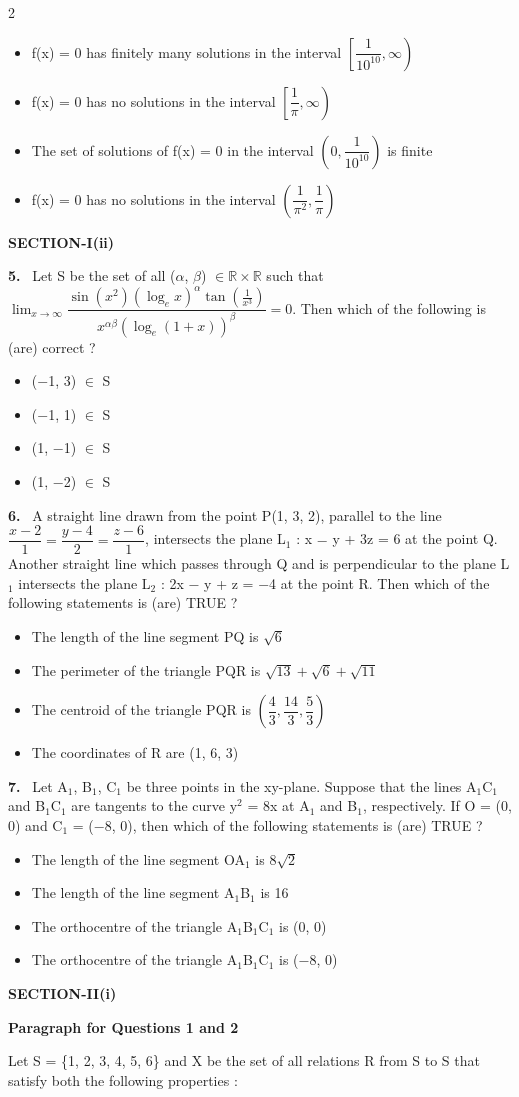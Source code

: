 \documentclass[10pt]{extarticle}
\newcommand{\sect}[1]{\par\smallskip\noindent\textbf{#1}\par}
\newcommand{\qn}[1]{\par\smallskip\noindent\textbf{#1.}~}
\newcommand{\paraq}[2]{\par\smallskip\noindent\textbf{Paragraph for Questions #1 and #2}\par}
\newenvironment{qoptions}{\begin{itemize}[leftmargin=1.8em,itemsep=1pt,topsep=2pt,label={}]}{\end{itemize}}
\newcommand{\opt}[2]{\item[(#1)] #2}
\begin{document}
\begin{multicols}{2}
\begin{qoptions}
\opt{A}{f(x) = 0 has finitely many solutions in the interval $\left[\dfrac1{10^{10}},\infty\right)$}
\opt{B}{f(x) = 0 has no solutions in the interval $\left[\dfrac1\pi,\infty\right)$}
\opt{C}{The set of solutions of f(x) = 0 in the interval $\left(0,\dfrac1{10^{10}}\right)$ is finite}
\opt{D}{f(x) = 0 has no solutions in the interval $\left(\dfrac1{\pi^2},\dfrac1\pi\right)$}
\end{qoptions}
\sect{SECTION-I(ii)}
\qn{5} Let S be the set of all ($\alpha$, $\beta$) $\in\mathbb R\times\mathbb R$ such that $\displaystyle\lim_{x\to\infty}\dfrac{\sin\left(x^2\right)\left(\log_ex\right)^\alpha\tan\left(\frac1{x^3}\right)}{x^{\alpha\beta}\left(\log_e(1+x)\right)^\beta}=0$. Then which of the following is (are) correct ?
\begin{qoptions}
\opt{A}{($-$1, 3) $\in$ S}
\opt{B}{($-$1, 1) $\in$ S}
\opt{C}{(1, $-$1) $\in$ S}
\opt{D}{(1, $-$2) $\in$ S}
\end{qoptions}
\qn{6} A straight line drawn from the point P(1, 3, 2), parallel to the line $\dfrac{x-2}1=\dfrac{y-4}2=\dfrac{z-6}1$, intersects the plane L$_1$ : x $-$ y + 3z = 6 at the point Q. Another straight line which passes through Q and is perpendicular to the plane L$_1$ intersects the plane L$_2$ : 2x $-$ y + z = $-$4 at the point R. Then which of the following statements is (are) TRUE ?
\begin{qoptions}
\opt{A}{The length of the line segment PQ is $\sqrt6$}
\opt{B}{The perimeter of the triangle PQR is $\sqrt{13}+\sqrt6+\sqrt{11}$}
\opt{C}{The centroid of the triangle PQR is $\left(\dfrac43,\dfrac{14}3,\dfrac53\right)$}
\opt{D}{The coordinates of R are (1, 6, 3)}
\end{qoptions}
\qn{7} Let A$_1$, B$_1$, C$_1$ be three points in the xy-plane. Suppose that the lines A$_1$C$_1$ and B$_1$C$_1$ are tangents to the curve y$^2$ = 8x at A$_1$ and B$_1$, respectively. If O = (0, 0) and C$_1$ = ($-$8, 0), then which of the following statements is (are) TRUE ?
\begin{qoptions}
\opt{A}{The length of the line segment OA$_1$ is 8$\sqrt2$}
\opt{B}{The length of the line segment A$_1$B$_1$ is 16}
\opt{C}{The orthocentre of the triangle A$_1$B$_1$C$_1$ is (0, 0)}
\opt{D}{The orthocentre of the triangle A$_1$B$_1$C$_1$ is ($-$8, 0)}
\end{qoptions}
\sect{SECTION-II(i)}
\paraq{1}{2}
Let S = \{1, 2, 3, 4, 5, 6\} and X be the set of all relations R from S to S that satisfy both the following properties :\par

\end{multicols}
\end{document}
